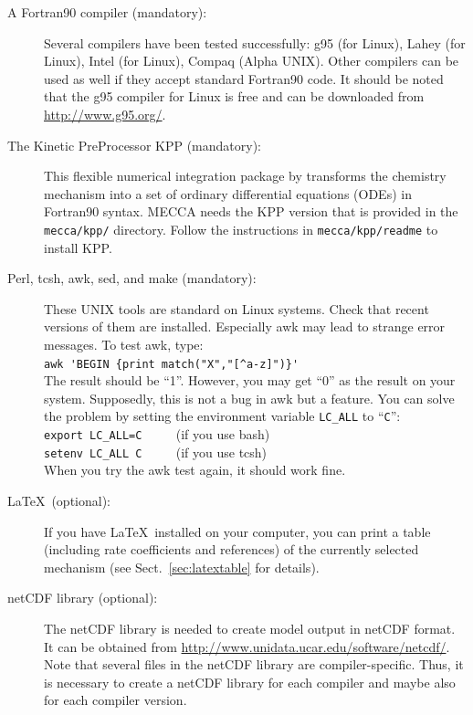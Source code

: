\documentclass[twoside]{article}
\begin{document}
\begin{description}
\item[A Fortran90 compiler (mandatory):] Several compilers have been
  tested successfully: g95 (for Linux), Lahey (for Linux), Intel (for
  Linux), Compaq (Alpha UNIX). Other compilers can be used as well if
  they accept standard Fortran90 code. It should be noted that the g95
  compiler for Linux is free and can be downloaded from
  \url{http://www.g95.org/}.
\item[The Kinetic PreProcessor KPP (mandatory):] This flexible numerical
  integration package by \citet{1665} transforms the chemistry mechanism
  into a set of ordinary differential equations (ODEs) in Fortran90
  syntax. MECCA needs the KPP version that is provided in the
  \verb|mecca/kpp/| directory. Follow the instructions in
  \verb|mecca/kpp/readme| to install KPP.
\item[Perl, tcsh, awk, sed, and make (mandatory):] These UNIX tools are
  standard on Linux systems. Check that recent versions of them are
  installed. Especially awk may lead to strange error messages.
  To test awk, type:\\
  \verb|awk 'BEGIN {print match("X","[^a-z]")}'|\\
  The result should be ``1''. However, you may get ``0'' as the result
  on your system. Supposedly, this is not a bug in awk but a feature.
  You can solve the problem by setting the environment variable
  \verb|LC_ALL| to ``\verb|C|'':\\
  \verb|export LC_ALL=C| $\qquad$ (if you use bash)\\
  \verb|setenv LC_ALL C| $\qquad$ (if you use tcsh)\\
  When you try the awk test again, it should work fine.
\item[La\TeX\ (optional):] If you have La\TeX\ installed on your
  computer, you can print a table (including rate coefficients and
  references) of the currently selected mechanism (see
  Sect.~\ref{sec:latextable} for details).
\item[netCDF library (optional):] The netCDF library is needed to create
  model output in netCDF format. It can be obtained from
  \url{http://www.unidata.ucar.edu/software/netcdf/}. Note that several
  files in the netCDF library are compiler-specific. Thus, it is
  necessary to create a netCDF library for each compiler and maybe also
  for each compiler version.


\end{description}
\end{document}
